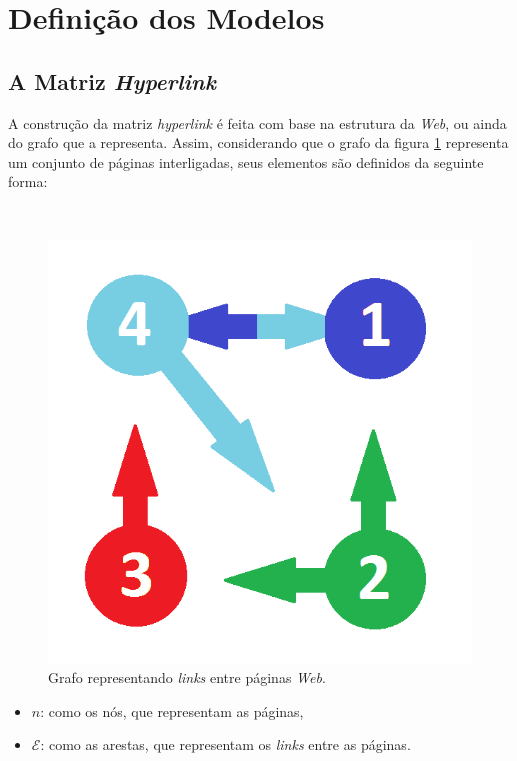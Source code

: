 \documentclass[a4paper]{report} %
\begin{document}
\section*{Definição dos Modelos}

\subsection*{A Matriz \textit{Hyperlink}}

A construção da matriz \textit{hyperlink} é feita com base na estrutura da \textit{Web}, ou ainda do grafo que a representa. Assim, considerando que o grafo da figura \ref{grafo} representa um conjunto de páginas interligadas, seus elementos são definidos da seguinte forma: 

\
\begin{figure}[!htb]
	\centering
	\includegraphics[scale=0.3]{imagens/grafo}
	\caption{Grafo representando \textit{links} entre páginas \textit{Web}.}
	\label{grafo}
\end{figure}

\begin{itemize}
\item $n$: como os n\'os, que representam as p\'aginas,

\vspace{0.1cm}
	
\item $\mathcal{E}$: como as arestas, que representam os \textit{links} entre as páginas.
\end{itemize}
\end{document}
